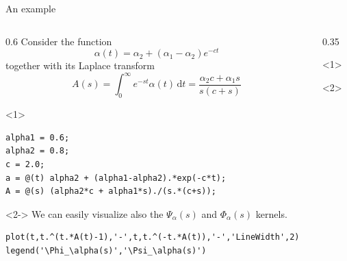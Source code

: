\documentclass[aspectratio=169,xcolor=dvipsnames]{beamer}
\begin{document}
\begin{frame}[fragile]{An example}

\begin{columns}
\begin{column}{0.6\columnwidth}
Consider the function
\[ \alpha(t) = \alpha_2 + (\alpha_1-\alpha_2) e^{-ct} \]
together with its Laplace transform
\[ 
A(s) = \int_{0}^{\infty} e^{-st} \alpha(t)\,\mathrm{d}t = \frac{\alpha_2 c + \alpha_1 s}{s(c+s)}
\]
\begin{onlyenv}<1>
\begin{verbatim}
alpha1 = 0.6;
alpha2 = 0.8;
c = 2.0;
a = @(t) alpha2 + (alpha1-alpha2).*exp(-c*t); 
A = @(s) (alpha2*c + alpha1*s)./(s.*(c+s));
\end{verbatim}
\end{onlyenv}
\begin{onlyenv}<2->
We can easily visualize also the $\Psi_\alpha(s)$ and $\Phi_\alpha(s)$ kernels.

\begin{verbatim}
plot(t,t.^(t.*A(t)-1),'-',t,t.^(-t.*A(t)),'-','LineWidth',2)
legend('\Phi_\alpha(s)','\Psi_\alpha(s)')
\end{verbatim}
\end{onlyenv}
\end{column}
\begin{column}{0.35\columnwidth}
\begin{onlyenv}<1>
\centering

\end{onlyenv}
\begin{onlyenv}<2>
\centering

\end{onlyenv}
\end{column}
\end{columns}

\end{frame}
\end{document}
